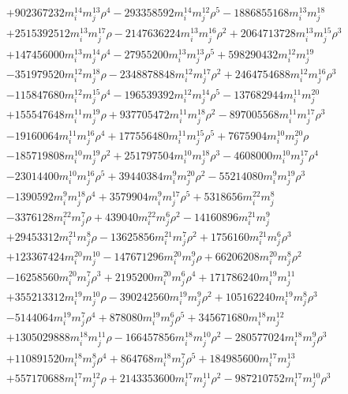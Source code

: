 {\begin{align*}
&+902367232m_i^{14}m_j^{13}\rho^{4}-293358592m_i^{14}m_j^{12}\rho^{5}-1886855168m_i^{13}m_j^{18}\\
&+2515392512m_i^{13}m_j^{17}\rho-2147636224m_i^{13}m_j^{16}\rho^{2}+2064713728m_i^{13}m_j^{15}\rho^{3}\\
&+147456000m_i^{13}m_j^{14}\rho^{4}-27955200m_i^{13}m_j^{13}\rho^{5}+598290432m_i^{12}m_j^{19}\\
&-351979520m_i^{12}m_j^{18}\rho-2348878848m_i^{12}m_j^{17}\rho^{2}+2464754688m_i^{12}m_j^{16}\rho^{3}\\
&-115847680m_i^{12}m_j^{15}\rho^{4}-196539392m_i^{12}m_j^{14}\rho^{5}-137682944m_i^{11}m_j^{20}\\
&+155547648m_i^{11}m_j^{19}\rho+937705472m_i^{11}m_j^{18}\rho^{2}-897005568m_i^{11}m_j^{17}\rho^{3}\\
&-19160064m_i^{11}m_j^{16}\rho^{4}+177556480m_i^{11}m_j^{15}\rho^{5}+7675904m_i^{10}m_j^{20}\rho\\
&-185719808m_i^{10}m_j^{19}\rho^{2}+251797504m_i^{10}m_j^{18}\rho^{3}-4608000m_i^{10}m_j^{17}\rho^{4}\\
&-23014400m_i^{10}m_j^{16}\rho^{5}+39440384m_i^{9}m_j^{20}\rho^{2}-55214080m_i^{9}m_j^{19}\rho^{3}\\
&-1390592m_i^{9}m_j^{18}\rho^{4}+3579904m_i^{9}m_j^{17}\rho^{5}+5318656m_i^{22}m_j^{8}\\
&-3376128m_i^{22}m_j^{7}\rho+439040m_i^{22}m_j^{6}\rho^{2}-14160896m_i^{21}m_j^{9}\\
&+29453312m_i^{21}m_j^{8}\rho-13625856m_i^{21}m_j^{7}\rho^{2}+1756160m_i^{21}m_j^{6}\rho^{3}\\
&+123367424m_i^{20}m_j^{10}-147671296m_i^{20}m_j^{9}\rho+66206208m_i^{20}m_j^{8}\rho^{2}\\
&-16258560m_i^{20}m_j^{7}\rho^{3}+2195200m_i^{20}m_j^{6}\rho^{4}+171786240m_i^{19}m_j^{11}\\
&+355213312m_i^{19}m_j^{10}\rho-390242560m_i^{19}m_j^{9}\rho^{2}+105162240m_i^{19}m_j^{8}\rho^{3}\\
&-5144064m_i^{19}m_j^{7}\rho^{4}+878080m_i^{19}m_j^{6}\rho^{5}+345671680m_i^{18}m_j^{12}\\
&+1305029888m_i^{18}m_j^{11}\rho-166457856m_i^{18}m_j^{10}\rho^{2}-280577024m_i^{18}m_j^{9}\rho^{3}\\
&+110891520m_i^{18}m_j^{8}\rho^{4}+864768m_i^{18}m_j^{7}\rho^{5}+184985600m_i^{17}m_j^{13}\\
&+557170688m_i^{17}m_j^{12}\rho+2143353600m_i^{17}m_j^{11}\rho^{2}-987210752m_i^{17}m_j^{10}\rho^{3}\\

\end{align*}}
